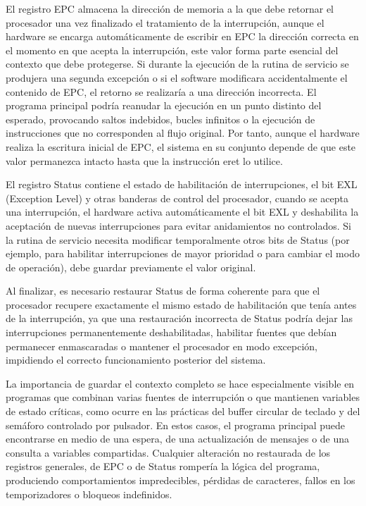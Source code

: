 \documentclass[12pt, letterpaper]{article}
\begin{document}
El registro EPC almacena la dirección de memoria a la que debe retornar el procesador una vez finalizado el tratamiento de la interrupción, aunque el hardware se encarga automáticamente de escribir en EPC la dirección correcta en el momento en que acepta la interrupción, este valor forma parte esencial del contexto que debe protegerse. Si durante la ejecución de la rutina de servicio se produjera una segunda excepción o si el software modificara accidentalmente el contenido de EPC, el retorno se realizaría a una dirección incorrecta. El programa principal podría reanudar la ejecución en un punto distinto del esperado, provocando saltos indebidos, bucles infinitos o la ejecución de instrucciones que no corresponden al flujo original. Por tanto, aunque el hardware realiza la escritura inicial de EPC, el sistema en su conjunto depende de que este valor permanezca intacto hasta que la instrucción eret lo utilice.

El registro Status contiene el estado de habilitación de interrupciones, el bit EXL (Exception Level) y otras banderas de control del procesador, cuando se acepta una interrupción, el hardware activa automáticamente el bit EXL y deshabilita la aceptación de nuevas interrupciones para evitar anidamientos no controlados. Si la rutina de servicio necesita modificar temporalmente otros bits de Status (por ejemplo, para habilitar interrupciones de mayor prioridad o para cambiar el modo de operación), debe guardar previamente el valor original.

Al finalizar, es necesario restaurar Status de forma coherente para que el procesador recupere exactamente el mismo estado de habilitación que tenía antes de la interrupción, ya que una restauración incorrecta de Status podría dejar las interrupciones permanentemente deshabilitadas, habilitar fuentes que debían permanecer enmascaradas o mantener el procesador en modo excepción, impidiendo el correcto funcionamiento posterior del sistema.

La importancia de guardar el contexto completo se hace especialmente visible en programas que combinan varias fuentes de interrupción o que mantienen variables de estado críticas, como ocurre en las prácticas del buffer circular de teclado y del semáforo controlado por pulsador. En estos casos, el programa principal puede encontrarse en medio de una espera, de una actualización de mensajes o de una consulta a variables compartidas. Cualquier alteración no restaurada de los registros generales, de EPC o de Status rompería la lógica del programa, produciendo comportamientos impredecibles, pérdidas de caracteres, fallos en los temporizadores o bloqueos indefinidos.\newpage
\end{document}
